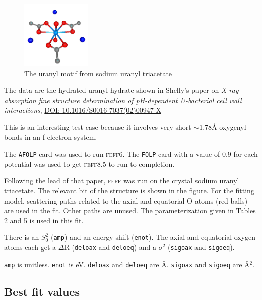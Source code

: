\documentclass[11pt]{article}
\begin{document}
\begin{figure}
  \begin{center}
    \includegraphics[width=0.3\textwidth]{uranyl/uranyl.png}
  \end{center}
  \caption{The uranyl motif from sodium uranyl triacetate}
\end{figure}

The data are the hydrated uranyl hydrate shown in Shelly's paper on
\emph{X-ray absorption fine structure determination of pH-dependent
  U-bacterial cell wall interactions},
\href{http://dx.doi.org/10.1016/S0016-7037(02)00947-X}{DOI:
  10.1016/S0016-7037(02)00947-X}

This is an interesting test case because it involves very short
$\sim$1.78{\AA} oxygenyl bonds in an f-electron system.

The \texttt{AFOLP} card was used to run \textsc{feff6}. The
\texttt{FOLP} card with a value of 0.9 for each potential was used to
get \textsc{feff8.5} to run to completion.

Following the lead of that paper, \textsc{feff} was run on the crystal sodium
uranyl triacetate. The relevant bit of the structure is shown in the
figure. For the fitting model, scattering paths related to the axial
and equatorial O atoms (red balls) are used in the fit. Other paths
are unused. The parameterization given in Tables 2 and 5 is used in
this fit.

There is an $S_0^2$ (\texttt{amp}) and an energy shift
(\texttt{enot}). The axial and equatorial oxygen atoms each get a
$\Delta$R (\texttt{deloax} and \texttt{deloeq}) and a $\sigma^2$
(\texttt{sigoax} and \texttt{sigoeq}).

\texttt{amp} is unitless. \texttt{enot} is eV. \texttt{deloax} and
\texttt{deloeq} are {\AA}. \texttt{sigoax} and \texttt{sigoeq} are
{\AA}$^2$.

\subsection{Best fit values}
\label{sec:orgheadline38}
\end{document}
